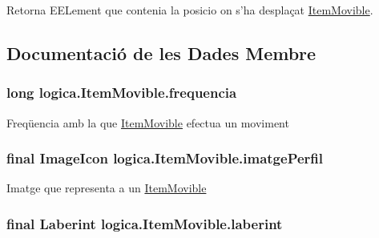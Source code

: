 \begin{DoxyReturn}{Retorna}
E\+E\+Lement que contenia la posicio on s'ha desplaçat \hyperlink{classlogica_1_1_item_movible}{Item\+Movible}. 
\end{DoxyReturn}


\subsection{Documentació de les Dades Membre}
\hypertarget{classlogica_1_1_item_movible_a1b3a9d9e664cfe044d60cbe083dc7919}{
\subsubsection[{frequencia}]{\setlength{\rightskip}{0pt plus 5cm}long logica.\+Item\+Movible.\+frequencia\hspace{0.3cm}{\ttfamily [private]}}}\label{classlogica_1_1_item_movible_a1b3a9d9e664cfe044d60cbe083dc7919}
Freqüencia amb la que \hyperlink{classlogica_1_1_item_movible}{Item\+Movible} efectua un moviment \hypertarget{classlogica_1_1_item_movible_a156a60365745803d0d3298b83aeacb73}{
\subsubsection[{imatge\+Perfil}]{\setlength{\rightskip}{0pt plus 5cm}final Image\+Icon logica.\+Item\+Movible.\+imatge\+Perfil}}\label{classlogica_1_1_item_movible_a156a60365745803d0d3298b83aeacb73}
Imatge que representa a un \hyperlink{classlogica_1_1_item_movible}{Item\+Movible} \hypertarget{classlogica_1_1_item_movible_a97036130b7376d77776427ca126f6fb5}{
\subsubsection[{laberint}]{\setlength{\rightskip}{0pt plus 5cm}final {\bf Laberint} logica.\+Item\+Movible.\+laberint\hspace{0.3cm}{\ttfamily [protected]}}}\label{classlogica_1_1_item_movible_a97036130b7376d77776427ca126f6fb5}

